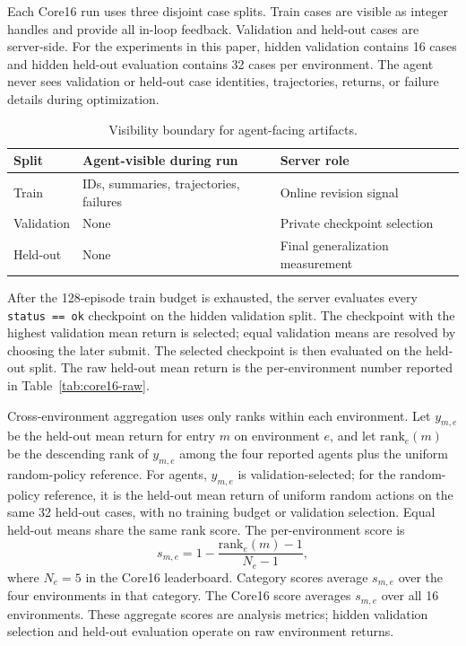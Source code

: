 Each Core16 run uses three disjoint case splits. Train cases are visible as
integer handles and provide all in-loop feedback. Validation and held-out cases
are server-side. For the experiments in this paper, hidden validation contains
16 cases and hidden held-out evaluation contains 32 cases per environment. The
agent never sees validation or held-out case identities, trajectories, returns,
or failure details during optimization.

\begin{table}[H]
\caption{Visibility boundary for agent-facing artifacts.}
\label{tab:visibility}
\begin{center}
\begin{tabular}{lll}
\toprule
Split & Agent-visible during run & Server role \\
\midrule
Train & IDs, summaries, trajectories, failures & Online revision signal \\
Validation & None & Private checkpoint selection \\
Held-out & None & Final generalization measurement \\
\bottomrule
\end{tabular}
\end{center}
\end{table}

After the 128-episode train budget is exhausted, the server evaluates every
\texttt{status == ok} checkpoint on the hidden validation split. The checkpoint
with the highest validation mean return is selected; equal validation means are
resolved by choosing the later submit. The selected checkpoint is then
evaluated on the held-out split. The raw held-out mean return is the
per-environment number reported in Table~\ref{tab:core16-raw}.

Cross-environment aggregation uses only ranks within each environment. Let
$y_{m,e}$ be the held-out mean return for entry $m$ on environment $e$, and
let $\mathrm{rank}_e(m)$ be the descending rank of $y_{m,e}$ among the four
reported agents plus the uniform random-policy reference. For agents,
$y_{m,e}$ is validation-selected; for the random-policy reference, it is the
held-out mean return of uniform random actions on the same 32 held-out cases,
with no training budget or validation selection. Equal held-out means share the
same rank score. The per-environment score is
\[
s_{m,e}=1-\frac{\mathrm{rank}_e(m)-1}{N_e-1},
\]
where $N_e=5$ in the Core16 leaderboard. Category scores average $s_{m,e}$
over the four environments in that category. The Core16 score averages
$s_{m,e}$ over all 16 environments. These aggregate scores are analysis
metrics; hidden validation selection and held-out evaluation operate on raw
environment returns.


